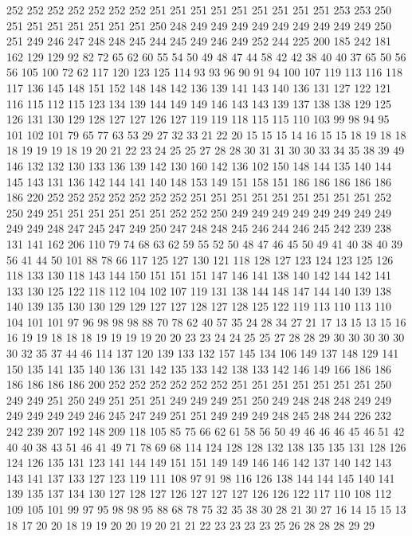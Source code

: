 252 252 252 252 252 252 252 251 251 251 251 251 251 251 251 251 253 253 250 251
251 251 251 251 251 251 250 248 249 249 249 249 249 249 249 249 249 250 251 249
246 247 248 248 245 244 245 249 246 249 252 244 225 200 185 242 181 162 129 129
92 82 72 65 62 60 55 54 50 49 48 47 44 58 42 42 38 40 40 37
65 50 56 56 105 100 72 62 117 120 123 125 114 93 93 96 90 91 94 100
107 119 113 116 118 117 136 145 148 151 152 148 148 142 136 139 141 143 140 136
131 127 122 121 116 115 112 115 123 134 139 144 149 149 146 143 143 139 137 138
138 129 125 126 131 130 129 128 127 127 126 127 119 119 118 115 115 110 103 99
98 94 95 101 102 101 79 65 77 63 53 29 27 32 33 21 22 20 15 15
15 14 16 15 15 18 19 18 18 18 19 19 19 18 19 20 21 22 23 24
25 25 27 28 28 30 31 31 30 30 33 34 35 38 39 49 146 132 132 130
133 136 139 142 130 160 142 136 102 150 148 144 135 140 144 145 143 131 136 142
144 141 140 148 153 149 151 158 151 186 186 186 186 186 186 220 252 252 252 252
252 252 252 251 251 251 251 251 251 251 251 251 252 250 249 251 251 251 251 251
251 252 252 250 249 249 249 249 249 249 249 249 249 249 248 247 245 247 249 250
247 248 248 245 246 244 246 245 242 239 238 131 141 162 206 110 79 74 68 63
62 59 55 52 50 48 47 46 45 50 49 41 40 38 40 39 56 41 44 50
101 88 78 66 117 125 127 130 121 118 128 127 123 124 123 125 126 118 133 130
118 143 144 150 151 151 151 147 146 141 138 140 142 144 142 141 133 130 125 122
118 112 104 102 107 119 131 138 144 148 147 144 140 139 138 140 139 135 130 130
129 129 127 127 128 127 128 125 122 119 113 110 113 110 104 101 101 97 96 98
98 98 88 70 78 62 40 57 35 24 28 34 27 21 17 13 15 13 15 16
16 19 19 18 18 18 19 19 19 19 20 20 23 23 24 24 25 25 27 28
28 29 30 30 30 30 30 30 32 35 37 44 46 114 137 120 139 133 132 157
145 134 106 149 137 148 129 141 150 135 141 135 140 136 131 142 135 133 142 138
133 142 146 149 166 186 186 186 186 186 186 200 252 252 252 252 252 252 251 251
251 251 251 251 251 250 249 249 251 250 249 251 251 251 249 249 249 251 250 249
248 248 248 249 249 249 249 249 249 246 245 247 249 251 251 249 249 249 248 245
248 244 226 232 242 239 207 192 148 209 118 105 85 75 66 62 61 58 56 50
49 46 46 46 45 46 51 42 40 40 38 43 51 46 41 49 71 78 69 68
114 124 128 128 132 138 135 135 131 128 126 124 126 135 131 123 141 144 149 151
151 149 149 146 146 142 137 140 142 143 143 141 137 133 127 123 119 111 108 97
91 98 116 126 138 144 144 145 140 141 139 135 137 134 130 127 128 127 126 127
127 127 126 126 122 117 110 108 112 109 105 101 99 97 95 98 98 95 88 68
78 75 32 35 38 30 28 21 30 27 16 14 15 15 13 18 17 20 20 18
19 19 20 20 19 20 21 21 22 23 23 23 23 25 26 28 28 28 29 29
